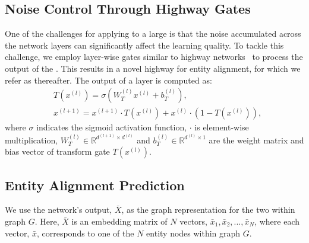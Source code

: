 	


	\subsection{Noise Control Through Highway Gates}
	\label{section:hgcn}
One of the challenges for applying \RGCNs to a large \KG is that the noise accumulated across the network layers can significantly affect
the learning quality. To tackle this challenge, we employ layer-wise gates similar to highway networks~\cite{Srivastava2015Highway} to
process the output of the \RGCN. This results in a novel highway \RGCN for entity alignment, for which we refer as \HRGCN thereafter. The
output of a \HRGCN layer is computed as:
%
%
	\begin{equation}
	\begin{split}
	&T(x^{(l)})=\sigma(W_T^{(l)}x^{(l)}+b_T^{(l)}), \\
	&x^{(l+1)}=x^{(l+1)} \cdot T(x^{(l)})+x^{(l)} \cdot (1-T(x^{(l)})),
	\end{split}
	\end{equation}
	where $\sigma$ indicates the sigmoid activation function, $\cdot$ is element-wise multiplication, $W_T^{(l)} \in \mathbb{R}^{d^{(l+1)}
\times d^{(l)}}$ and $b_T^{(l)} \in \mathbb{R}^{d^{(l)} \times 1}$ are the weight matrix and bias vector of transform gate $T(x^{(l)})$.

	
	\subsection{Entity Alignment Prediction\label{prediction}}
   We use the network's output, $\bar{X}$, as the graph representation for the two \KGs within graph
    $G$. Here, $\bar{X}$ is an embedding matrix of $N$ vectors, $\bar{x}_1,\bar{x}_2,...,\bar{x}_N$, where each vector, $\bar{x}$, corresponds to one
    of the $N$ entity nodes within graph $G$. 	


